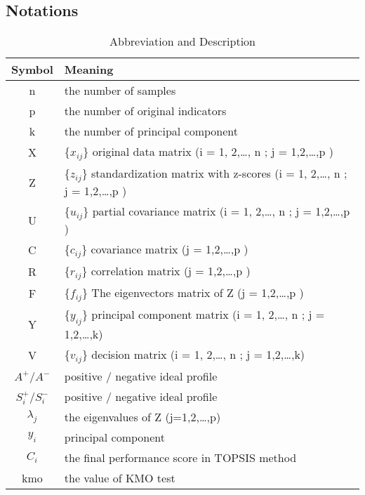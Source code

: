 \documentclass{mcmthesis}
\begin{document}
    \subsection{Notations}
         \begin{table}[!htbp]
                \begin{tabular}{c|l}
                  \hline
                  Symbol & Meaning \\
                  \hline
                  n & the number of samples \\
                  p & the number of original indicators \\
                  k & the number of principal component \\
                  X & \{$x_{ij}$\} original data matrix (i = 1, 2,…, n ; j = 1,2,…,p ) \\
                  Z & \{$z_{ij}$\} standardization matrix with z-scores (i = 1, 2,…, n ; j = 1,2,…,p ) \\
                  U & \{$u_{ij}$\} partial covariance matrix (i = 1, 2,…, n ; j = 1,2,…,p ) \\
                  C & \{$c_{ij}$\} covariance matrix (j = 1,2,…,p ) \\
                  R & \{$r_{ij}$\} correlation matrix (j = 1,2,…,p ) \\
                  F & \{$f_{ij}$\} The eigenvectors matrix of Z (j = 1,2,…,p ) \\
                  Y & \{$y_{ij}$\} principal component matrix (i = 1, 2,…, n ; j = 1,2,…,k) \\
                  V & \{$v_{ij}$\} decision matrix (i = 1, 2,…, n ; j = 1,2,…,k) \\
                  $A^+$/$A^-$ & positive / negative ideal profile \\
                  $S_{i}^+$/$S_{i}^-$ & positive / negative ideal profile \\
                  $\lambda_{j}$ & the eigenvalues of Z (j=1,2,…,p) \\
                  $y_{i}$ & principal component \\
                  $C_{i}$ & the final performance score in TOPSIS method \\
                  kmo & the value of KMO test \\
                  \hline
                \end{tabular}
           \caption{Abbreviation and Description}
         \end{table}
\end{document}

